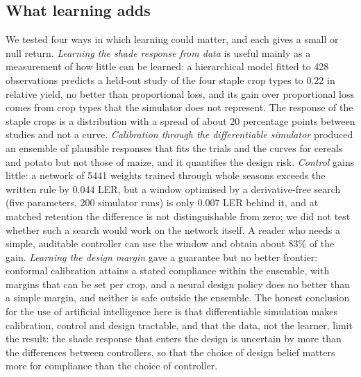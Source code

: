 \subsection{What learning adds}\label{sec:ai}
We tested four ways in which learning could matter, and each gives a small or null return. \emph{Learning the shade response from data} is useful mainly as a measurement of how little can be learned: a hierarchical model fitted to 428 observations predicts a held-out study of the four staple crop types to 0.22 in relative yield, no better than proportional loss, and its gain over proportional loss comes from crop types that the simulator does not represent. The response of the staple crops is a distribution with a spread of about 20 percentage points between studies and not a curve. \emph{Calibration through the differentiable simulator} produced an ensemble of plausible responses that fits the trials and the curves for cereals and potato but not those of maize, and it quantifies the design risk. \emph{Control} gains little: a network of 5441 weights trained through whole seasons exceeds the written rule by 0.044 LER, but a window optimised by a derivative-free search (five parameters, 200 simulator runs) is only 0.007 LER behind it, and at matched retention the difference is not distinguishable from zero; we did not test whether such a search would work on the network itself. A reader who needs a simple, auditable controller can use the window and obtain about 83\% of the gain. \emph{Learning the design margin} gave a guarantee but no better frontier: conformal calibration attains a stated compliance within the ensemble, with margins that can be set per crop, and a neural design policy does no better than a simple margin, and neither is safe outside the ensemble. The honest conclusion for the use of artificial intelligence here is that differentiable simulation makes calibration, control and design tractable, and that the data, not the learner, limit the result: the shade response that enters the design is uncertain by more than the differences between controllers, so that the choice of design belief matters more for compliance than the choice of controller.

